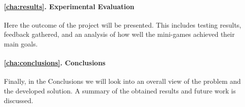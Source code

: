 \paragraph{\ref{cha:results}. Experimental Evaluation} Here the outcome of the project will be presented. This includes testing results, feedback gathered, and an analysis of how well the mini-games achieved their main goals.

\paragraph{\ref{cha:conclusions}. Conclusions} Finally, in the Conclusions we will look into an overall view of the problem and the developed solution. A summary of the obtained results and future work is discussed.


\newpage



